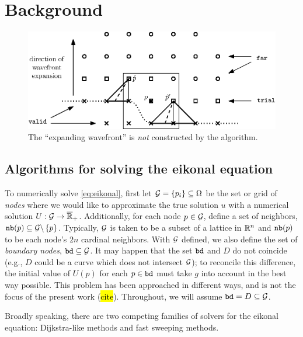 \documentclass[eikonal.tex]{subfiles}
\begin{document}
\section{Background}\label{sec:background}

\begin{figure}[t]
  \centering
  \includegraphics{overview.eps}
  \caption{The ``expanding wavefront'' is \emph{not} constructed by
    the algorithm.}
  \label{fig:overview}
\end{figure}

\subsection{Algorithms for solving the eikonal equation}

To numerically solve \cref{eq:eikonal}, first let
$\mathcal{G} = \{p_i\} \subseteq \Omega$ be the set or grid of \emph{nodes}
where we would like to approximate the true solution $u$ with a
numerical solution $U : \mathcal{G} \to
\overline{\mathbb{R}}_+$. Additionally, for each node $p \in \mathcal{G}$,
define a set of neighbors,
$\texttt{nb}(p) \subseteq \mathcal{G} \backslash \left\{p\right\}$. Typically, $\mathcal{G}$ is
taken to be a subset of a lattice in $\mathbb{R}^n$ and $\texttt{nb}(p)$ to be each
node's $2n$ cardinal neighbors. With $\mathcal{G}$ defined, we also define
the set of \emph{boundary nodes}, $\texttt{bd} \subseteq \mathcal{G}$. It may
happen that the set $\texttt{bd}$ and $D$ do not coincide (e.g., $D$
could be a curve which does not intersect $\mathcal{G}$); to reconcile this
difference, the initial value of $U(p)$ for each $p \in \texttt{bd}$
must take $g$ into account in the best way possible. This problem has
been approached in different ways, and is not the focus of the present
work (\hl{cite}). Throughout, we will assume
$\texttt{bd} = D \subseteq \mathcal{G}$.

Broadly speaking, there are two competing families of solvers for the
eikonal equation: Dijkstra-like methods and fast sweeping methods. 
\end{document}
